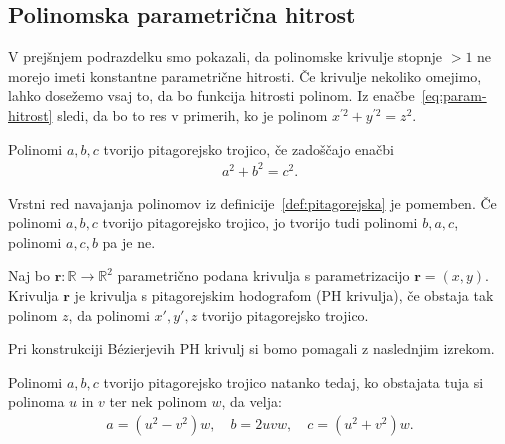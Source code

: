 \documentclass[isrm2, tisk]{fmfdelo}
\newcommand{\R}{\mathbb R}
\begin{document}
    \subsection{Polinomska parametrična hitrost}
    V prejšnjem podrazdelku smo pokazali, da polinomske krivulje stopnje $>1$ ne morejo imeti konstantne parametrične hitrosti.
    Če krivulje nekoliko omejimo, lahko dosežemo vsaj to, da bo funkcija hitrosti polinom.
    Iz enačbe~\eqref{eq:param-hitrost} sledi, da bo to res v primerih, ko je polinom $x^{'2}+y^{'2}=z^2$.
    \begin{definicija}
        \label{def:pitagorejska}
        Polinomi $a,b,c$ tvorijo pitagorejsko trojico, če zadoščajo enačbi
        \begin{align*}
            a^2+b^2=c^2.
        \end{align*}
    \end{definicija}
    \begin{opomba}
        Vrstni red navajanja polinomov iz definicije~\ref{def:pitagorejska} je pomemben.
        Če polinomi $a,b,c$ tvorijo pitagorejsko trojico, jo tvorijo tudi polinomi $b,a,c$, polinomi $a,c,b$ pa je ne.
    \end{opomba}
    \begin{definicija}
        Naj bo $\mathbf{r}:\R\to\R^2$ parametrično podana krivulja s parametrizacijo $\mathbf{r}=(x,y)$.
        Krivulja $\mathbf{r}$ je krivulja s pitagorejskim hodografom (PH krivulja), če obstaja tak polinom $z$, da polinomi $x',y',z$ tvorijo pitagorejsko trojico.
    \end{definicija}
    \noindent Pri konstrukciji Bézierjevih PH krivulj si bomo pomagali z naslednjim izrekom.
    \begin{izrek}
        \label{izrek:pitagorejske}         %
        Polinomi $a,b,c$ tvorijo pitagorejsko trojico natanko tedaj, ko obstajata tuja si polinoma $u$ in $v$ ter nek polinom  $w$, da velja:
        \begin{align*}
            a=(u^2-v^2)w,\quad b=2uvw,\quad c=(u^2+v^2)w.
        \end{align*}
    \end{izrek}
\end{document}
